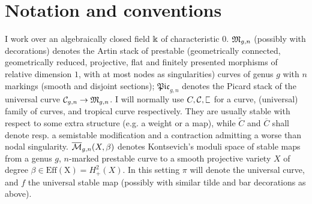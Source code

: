 \section*{Notation and conventions}
I work over an algebraically closed field $\Bbbk$ of characteristic $0$. $\mathfrak M_{g,n}$ (possibly with decorations) denotes the Artin stack of prestable (geometrically connected, geometrically reduced, projective, flat and finitely presented morphisms of relative dimension $1$, with at most nodes as singularities) curves of genus $g$ with $n$ markings (smooth and disjoint sections); $\mathfrak{Pic}_{g,n}$ denotes the Picard stack of the universal curve $\mathcal C_{g,n}\rightarrow\mathfrak M_{g,n}$. I will normally use $C,\mathcal C,\plC$ for a curve, (universal) family of curves, and tropical curve respectively. They are usually stable with respect to some extra structure (e.g. a weight or a map), while $\widetilde{C}$ and $\overline{C}$ shall denote resp. a semistable modification and a contraction admitting a worse than nodal singularity. $\overline{\mathcal{M}}_{g,n}(X,\beta)$ denotes Kontsevich's moduli space of stable maps from a genus $g$, $n$-marked prestable curve to a smooth projective variety $X$ of degree $\beta\in\operatorname{Eff(X)}=H^2_+(X)$. In this setting $\pi$ will denote the universal curve, and $f$ the universal stable map (possibly with similar tilde and bar decorations as above).
